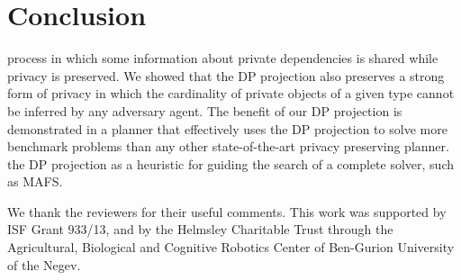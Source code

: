 \documentclass[letterpaper]{article}
\theoremstyle{definition}
\begin{document}
\vspace{-0.87mm}
\vspace{-1.47mm}
\section{Conclusion}
process in which some information about private dependencies is shared while privacy is preserved. We showed that the DP projection also preserves a strong form of privacy in which the cardinality of private objects of a given type cannot be inferred by any adversary agent. The benefit of our DP projection is demonstrated in a planner that effectively uses the DP projection to solve more benchmark problems than any other state-of-the-art privacy preserving planner.  the DP projection as a heuristic for guiding the search of a complete solver, such as MAFS.

 We thank the reviewers for their useful comments. This work was supported by ISF Grant 933/13, and by the Helmsley Charitable Trust through the Agricultural, Biological and Cognitive Robotics Center of Ben-Gurion University of the Negev.









\clearpage

\end{document}
